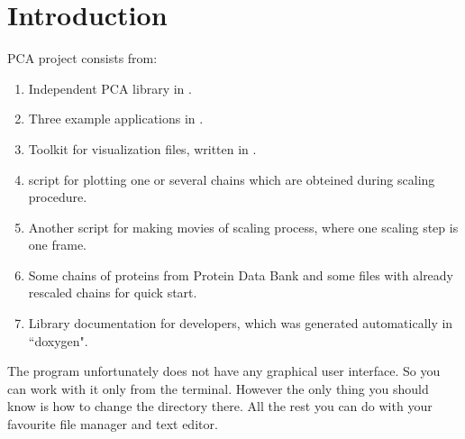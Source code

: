 \documentclass[12pt]{article}
\begin{document}
\thispagestyle{empty} %
\titleAT


\newpage
\tableofcontents
\newpage

\section*{Introduction} 
PCA project consists from:
\begin{enumerate}
\item Independent PCA library in .
\item Three example applications in .
\item Toolkit for visualization  files, written in .
\item {} script for plotting one or several chains which are obteined during scaling procedure.
\item Another  script for making movies of scaling process, where one scaling step is one frame.
\item Some chains of proteins from Protein Data Bank and some files with already rescaled chains for quick start.
\item Library documentation for developers, which was generated automatically in ``doxygen".
\end{enumerate}
The program unfortunately does not have any graphical user interface. So you can work with it only from the terminal. However the only thing you should know is how to change the directory there. All the rest you can do with your favourite file manager and text editor.
\end{document}
